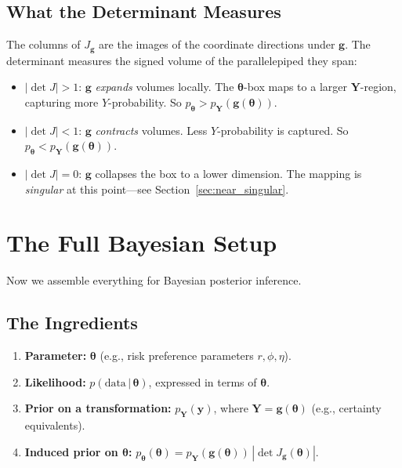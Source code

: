 \documentclass[11pt,a4paper]{article}
\theoremstyle{definition}
\newcommand{\given}{\,|\,}
\newcommand{\btheta}{\boldsymbol{\theta}}
\begin{document}
\subsection{What the Determinant Measures}

The columns of $J_{\mathbf{g}}$ are the images of the coordinate directions
under $\mathbf{g}$. The determinant measures the signed volume of the
parallelepiped they span:
\begin{itemize}
    \item $|\!\det J| > 1$: $\mathbf{g}$ \emph{expands} volumes locally.
    The $\btheta$-box maps to a larger $\mathbf{Y}$-region, capturing more
    $Y$-probability. So $p_{\btheta} > p_{\mathbf{Y}}(\mathbf{g}(\btheta))$.

    \item $|\!\det J| < 1$: $\mathbf{g}$ \emph{contracts} volumes. Less
    $Y$-probability is captured. So $p_{\btheta} < p_{\mathbf{Y}}(\mathbf{g}(\btheta))$.

    \item $|\!\det J| = 0$: $\mathbf{g}$ collapses the box to a lower
    dimension. The mapping is \emph{singular} at this point---see
    Section~\ref{sec:near_singular}.
\end{itemize}


\section{The Full Bayesian Setup}
\label{sec:bayesian}

Now we assemble everything for Bayesian posterior inference.

\subsection{The Ingredients}

\begin{enumerate}
    \item \textbf{Parameter:} $\btheta$ (e.g., risk preference parameters
    $r, \phi, \eta$).
    \item \textbf{Likelihood:} $p(\text{data} \given \btheta)$, expressed in
    terms of $\btheta$.
    \item \textbf{Prior on a transformation:} $p_{\mathbf{Y}}(\mathbf{y})$,
    where $\mathbf{Y} = \mathbf{g}(\btheta)$ (e.g., certainty equivalents).
    \item \textbf{Induced prior on $\btheta$:}
    $p_{\btheta}(\btheta) = p_{\mathbf{Y}}(\mathbf{g}(\btheta)) \,
    |\!\det J_{\mathbf{g}}(\btheta)|$.
\end{enumerate}
\end{document}
